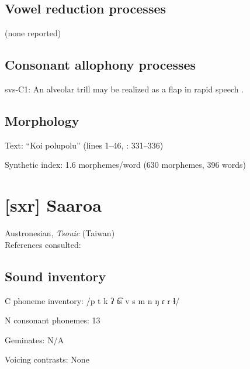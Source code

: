 {\subsection*{Vowel reduction processes}

(none reported)
\subsection*{Consonant allophony processes}
\begin{appendixdesc}

\item[svs-C1:] An alveolar trill may be realized as a flap in rapid speech \citep[17]{Wegener2008}.
\end{appendixdesc}
\subsection*{Morphology}

\begin{appendixdesc}

\item[Text:] “Koi polupolu” (lines 1--46, \citealt{Wegener2008}: 331--336)

\item[Synthetic index:] 1.6 morphemes/word (630 morphemes, 396 words)
\end{appendixdesc}

\section*{[sxr] Saaroa}   %
Austronesian, \textit{Tsouic} (Taiwan)\medskip\\
References consulted: \citet{Pan2012}

\subsection*{Sound inventory}
\begin{appendixdesc}

\item[C phoneme inventory:] /p t k ʔ t͡s v s m n ŋ ɾ r ɬ/

\item[N consonant phonemes:] 13

\item[Geminates:] N/A

\item[Voicing contrasts:] None


\end{appendixdesc}}
